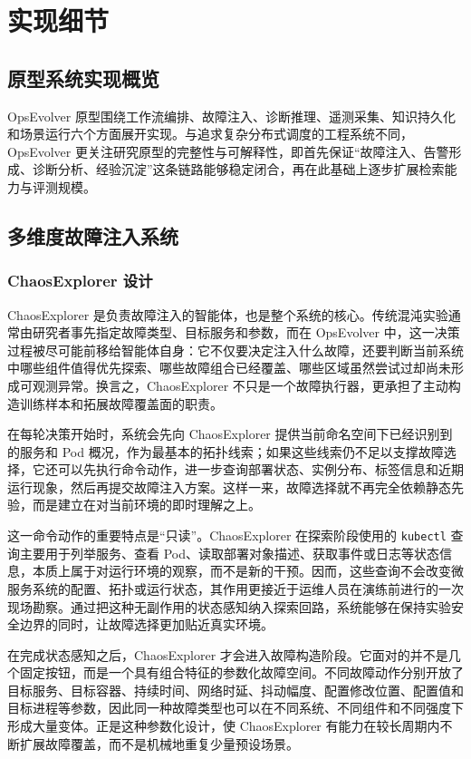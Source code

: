\chapter{实现细节}
\label{cha:implementation_details}

\section{原型系统实现概览}
\label{sec:impl_overview}

OpsEvolver 原型围绕工作流编排、故障注入、诊断推理、遥测采集、知识持久化和场景运行六个方面展开实现。与追求复杂分布式调度的工程系统不同，OpsEvolver 更关注研究原型的完整性与可解释性，即首先保证“故障注入、告警形成、诊断分析、经验沉淀”这条链路能够稳定闭合，再在此基础上逐步扩展检索能力与评测规模。

\section{多维度故障注入系统}
\label{sec:fault_injection_impl}

\subsection{ChaosExplorer 设计}

ChaosExplorer 是负责故障注入的智能体，也是整个系统的核心。传统混沌实验通常由研究者事先指定故障类型、目标服务和参数，而在 OpsEvolver 中，这一决策过程被尽可能前移给智能体自身：它不仅要决定注入什么故障，还要判断当前系统中哪些组件值得优先探索、哪些故障组合已经覆盖、哪些区域虽然尝试过却尚未形成可观测异常。换言之，ChaosExplorer 不只是一个故障执行器，更承担了主动构造训练样本和拓展故障覆盖面的职责。

在每轮决策开始时，系统会先向 ChaosExplorer 提供当前命名空间下已经识别到的服务和 Pod 概况，作为最基本的拓扑线索；如果这些线索仍不足以支撑故障选择，它还可以先执行命令动作，进一步查询部署状态、实例分布、标签信息和近期运行现象，然后再提交故障注入方案。这样一来，故障选择就不再完全依赖静态先验，而是建立在对当前环境的即时理解之上。

这一命令动作的重要特点是“只读”。ChaosExplorer 在探索阶段使用的 \texttt{kubectl} 查询主要用于列举服务、查看 Pod、读取部署对象描述、获取事件或日志等状态信息，本质上属于对运行环境的观察，而不是新的干预。因而，这些查询不会改变微服务系统的配置、拓扑或运行状态，其作用更接近于运维人员在演练前进行的一次现场勘察。通过把这种无副作用的状态感知纳入探索回路，系统能够在保持实验安全边界的同时，让故障选择更加贴近真实环境。

在完成状态感知之后，ChaosExplorer 才会进入故障构造阶段。它面对的并不是几个固定按钮，而是一个具有组合特征的参数化故障空间。不同故障动作分别开放了目标服务、目标容器、持续时间、网络时延、抖动幅度、配置修改位置、配置值和目标进程等参数，因此同一种故障类型也可以在不同系统、不同组件和不同强度下形成大量变体。正是这种参数化设计，使 ChaosExplorer 有能力在较长周期内不断扩展故障覆盖，而不是机械地重复少量预设场景。

